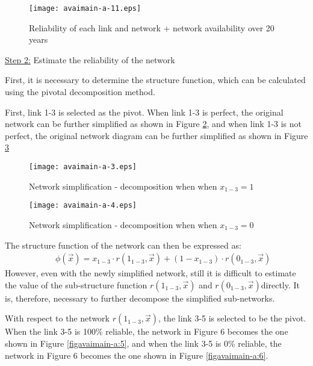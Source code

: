 \begin{figure}[h]
\texttt{[image: avaimain-a-11.eps]}
\caption{Reliability of each link and network + network availability over 20
years}\label{figavaimain-a:3}
\end{figure}

\underline{Step 2:} Estimate the reliability of the network

First, it is necessary to determine the structure function, which can be
calculated using the pivotal decomposition method.

First, link 1-3 is selected as the pivot. When link 1-3 is perfect, the
original network can be further simplified as shown in Figure \ref{figavaimain-a:3}, and when link
1-3 is not perfect, the original network diagram can be further simplified as
shown in Figure \ref{figavaimain-a:4}

\begin{figure}[h]
\texttt{[image: avaimain-a-3.eps]}
\caption{Network simplification - decomposition when when ${x_{1 - 3}} = 1$}\label{figavaimain-a:3}
\end{figure}

\begin{figure}[h]
\texttt{[image: avaimain-a-4.eps]}
\caption{Network simplification - decomposition when when ${x_{1 - 3}} = 0$}\label{figavaimain-a:4}
\end{figure}
The structure function of the network can then be expressed as:
\begin{eqnarray}
&& \phi (\vec x) = {x_{1 - 3}} \cdot r({1_{1 - 3}},\vec x) + (1 - {x_{1 - 3}})
\cdot r({0_{1 - 3}},\vec x)
\label{eqavaimain:5}
\end{eqnarray}
However, even with the newly simplified network, still it is difficult
to estimate the value of the sub-structure function $r({1_{1 - 3}},\vec x)$ and
$r({0_{1 - 3}},\vec x)$directly. It is, therefore, necessary to further decompose
the simplified sub-networks.

With respect to the network $r({1_{1 - 3}},\vec x)$, the link 3-5 is
selected to be the pivot. When the link 3-5 is 100\% reliable, the network in
Figure 6 becomes the one shown in Figure \ref{figavaimain-a:5}, and when the link 3-5 is
0\% reliable, the network in Figure 6 becomes the one shown in Figure
\ref{figavaimain-a:6}.

